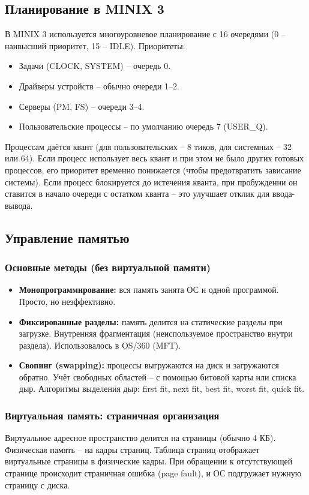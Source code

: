 \documentclass[a4paper,12pt]{article}
\begin{document}
\subsection{Планирование в MINIX 3}
В MINIX 3 используется многоуровневое планирование с 16 очередями (0 – наивысший приоритет, 15 – IDLE). Приоритеты:
\begin{itemize}
    \item Задачи (CLOCK, SYSTEM) – очередь 0.
    \item Драйверы устройств – обычно очереди 1–2.
    \item Серверы (PM, FS) – очереди 3–4.
    \item Пользовательские процессы – по умолчанию очередь 7 (USER\_Q).
\end{itemize}
Процессам даётся квант (для пользовательских – 8 тиков, для системных – 32 или 64). Если процесс использует весь квант и при этом не было других готовых процессов, его приоритет временно понижается (чтобы предотвратить зависание системы). Если процесс блокируется до истечения кванта, при пробуждении он ставится в начало очереди с остатком кванта – это улучшает отклик для ввода-вывода.

\subsection{Управление памятью}
\subsubsection{Основные методы (без виртуальной памяти)}
\begin{itemize}
    \item \textbf{Монопрограммирование:} вся память занята ОС и одной программой. Просто, но неэффективно.
    \item \textbf{Фиксированные разделы:} память делится на статические разделы при загрузке. Внутренняя фрагментация (неиспользуемое пространство внутри раздела). Использовалось в OS/360 (MFT).
    \item \textbf{Свопинг (swapping):} процессы выгружаются на диск и загружаются обратно. Учёт свободных областей – с помощью битовой карты или списка дыр. Алгоритмы выделения дыр: first fit, next fit, best fit, worst fit, quick fit.
\end{itemize}

\subsubsection{Виртуальная память: страничная организация}
Виртуальное адресное пространство делится на страницы (обычно 4 КБ). Физическая память – на кадры страниц. Таблица страниц отображает виртуальные страницы в физические кадры. При обращении к отсутствующей странице происходит страничная ошибка (page fault), и ОС подгружает нужную страницу с диска.
\end{document}
